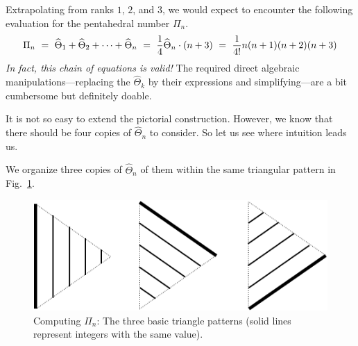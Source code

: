 \medskip

Extrapolating from ranks $1$, $2$, and $3$, we would expect to encounter the following evaluation for the pentahedral number $\Pi_n$.
\[
\Pi_n \ = \ \widehat{\Theta}_1 + \widehat{\Theta}_2 + \cdots + \widehat{\Theta}_n \ = \
{1 \over 4} \widehat{\Theta}_n \cdot (n+3) \ = \ {1 \over 4!} n(n+1)(n+2)(n+3) 
\]
{\em In fact, this chain of equations is valid!}  The required direct algebraic manipulations---replacing the $\widehat{\Theta}_k$ by their expressions and simplifying---are a bit cumbersome but definitely doable.

\smallskip

It is not so easy to extend the pictorial construction.  However, we know that there should be four copies of $\widehat{\Theta}_n$ to consider.  So let us see where intuition leads us.

\smallskip

We organize three copies of $\widehat{\Theta}_n$ of them within the same triangular pattern in Fig.~\ref{fig:Tetrahedral6}.
\begin{figure}[h]
\begin{center}
        \includegraphics[scale=0.3]{FiguresArithmetic/appTetrahedral6}
        \caption{Computing $\Pi_n$: The three basic triangle patterns (solid lines represent integers with the same value).}
        \label{fig:Tetrahedral6}
\end{center}
\end{figure}

